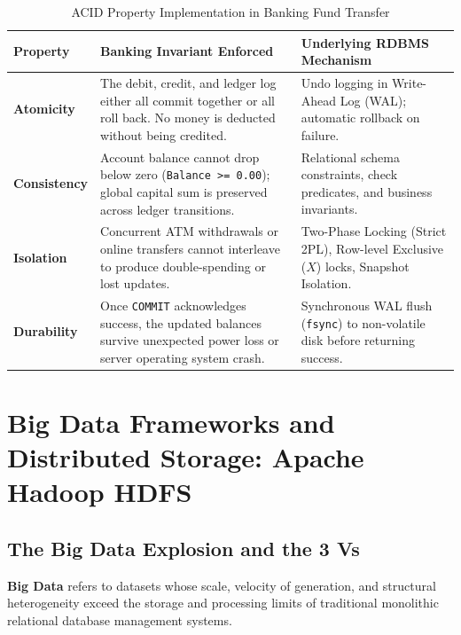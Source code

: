 \begin{table}[htbp]
\centering
\small
\caption{ACID Property Implementation in Banking Fund Transfer}
\label{tab:banking_acid_matrix}
\begin{tabularx}{\textwidth}{l X X}
\toprule
\textbf{Property} & \textbf{Banking Invariant Enforced} & \textbf{Underlying RDBMS Mechanism} \\
\midrule
\textbf{Atomicity} & The debit, credit, and ledger log either all commit together or all roll back. No money is deducted without being credited. & Undo logging in Write-Ahead Log (WAL); automatic rollback on failure. \\
\textbf{Consistency} & Account balance cannot drop below zero (\texttt{Balance >= 0.00}); global capital sum is preserved across ledger transitions. & Relational schema constraints, check predicates, and business invariants. \\
\textbf{Isolation} & Concurrent ATM withdrawals or online transfers cannot interleave to produce double-spending or lost updates. & Two-Phase Locking (Strict 2PL), Row-level Exclusive ($X$) locks, Snapshot Isolation. \\
\textbf{Durability} & Once \texttt{COMMIT} acknowledges success, the updated balances survive unexpected power loss or server operating system crash. & Synchronous WAL flush (\texttt{fsync}) to non-volatile disk before returning success. \\
\bottomrule
\end{tabularx}
\end{table}

\section{Big Data Frameworks and Distributed Storage: Apache Hadoop HDFS}
\label{sec:dbms_hadoop_hdfs}

\subsection{The Big Data Explosion and the 3 Vs}
\textbf{Big Data} refers to datasets whose scale, velocity of generation, and structural heterogeneity exceed the storage and processing limits of traditional monolithic relational database management systems.

